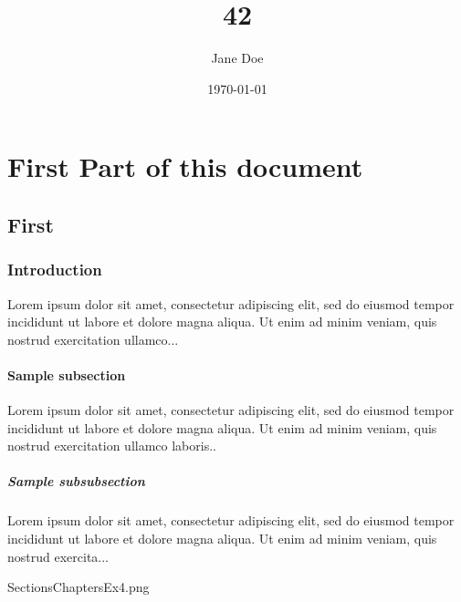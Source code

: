 \documentclass{book}
\title{42}
\author{Jane Doe}
\date{\today}
\begin{document}
\maketitle

\tableofcontents

\part{First Part of this document}

\chapter{First}

\section{Introduction}
Lorem ipsum dolor sit amet, consectetur adipiscing elit, sed do
eiusmod tempor incididunt ut labore et dolore magna aliqua. Ut
enim ad minim veniam, quis nostrud exercitation ullamco...

\subsection{Sample subsection}
Lorem ipsum dolor sit amet, consectetur adipiscing elit, sed do
eiusmod tempor incididunt ut labore et dolore magna aliqua. Ut
enim ad minim veniam, quis nostrud exercitation ullamco laboris..

\subsubsection{Sample subsubsection}
Lorem ipsum dolor sit amet, consectetur adipiscing elit, sed do
eiusmod tempor incididunt ut labore et dolore magna aliqua. Ut
enim ad minim veniam, quis nostrud exercita...

SectionsChaptersEx4.png
\end{document}
